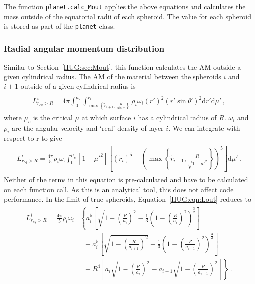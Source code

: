 \documentclass[11pt, oneside]{article}   	%
\begin{document}
The function \texttt{planet.calc\_Mout} applies the above equations and calculates the mass outside of the equatorial radii of each spheroid.
The value for each spheroid is stored as part of the \texttt{planet} class.


\subsubsection{Radial angular momentum distribution}

Similar to Section~\ref{HUG:sec:Mout}, this function calculates the AM outside a given cylindrical radius.
The AM of the material between the spheroids $i$ and $i+1$ outside of a given cylindrical radius is
%
\begin{align}
\begin{aligned}
L_{r_{eq}>R}^i = 4 \pi \int_0^{\mu_c} \int_{\max{\left \{ \tilde{r}_{i+1},\frac{R}{\sin\theta'}\right\}}}^{\tilde{r}_i} \rho_i \omega_i \left ( r' \right )^2 \left ( r' \sin \theta' \right )^2 \mathrm{d}r' \mathrm{d}\mu' \,,
\end{aligned}
\end{align}
%
where $\mu_c$ is the critical $\mu$ at which surface $i$ has a cylindrical radius of $R$.
$\omega_i$ and $\rho_i$ are the angular velocity and `real' density of layer $i$.
We can integrate with respect to r to give
%
\begin{align}
\begin{aligned}
L_{r_{eq}>R}^i = \frac{4 \pi}{5} \rho_i \omega_i \int_0^{\mu_c} \left [ 1-\mu'^2 \right ] \left [ \left(\tilde{r}_i\right)^5 - \left(\max{\left \{ \tilde{r}_{i+1},\frac{R}{\sqrt{1-\mu'^2}}\right\}} \right )^5 \right ] \mathrm{d}\mu' \,.
\label{HUG:eqn:Lout}
\end{aligned}
\end{align}
%
Neither of the terms in this equation is pre-calculated and have to be calculated on each function call. 
As this is an analytical tool, this does not affect code performance.
In the limit of true spheroids, Equation~\ref{HUG:eqn:Lout} reduces to
%
\begin{align}
\begin{aligned}
L_{r_{eq}>R}^i =  \frac{4 \pi}{5} \rho_i \omega_i  {} & \left \{ a_i^5 \left [ \sqrt{1-\left (\frac{R}{a_i}\right )^2} - \frac{1}{3} \left ( 1-\left (\frac{R}{a_i}\right )^2 \right )^{\frac{3}{2}} \right ] \right . \\
& \left . \;\; - a_i^5 \left [ \sqrt{1-\left (\frac{R}{a_{i+1}}\right )^2} - \frac{1}{3} \left ( 1-\left (\frac{R}{a_{i+1}}\right )^2 \right )^{\frac{3}{2}} \right ] \right . \\
& \left . \; \;- R^4 \left [ a_i \sqrt{1-\left (\frac{R}{a_{i}}\right )^2} - a_{i+1} \sqrt{1-\left (\frac{R}{a_{i+1}}\right )^2} \right ] \right \} \,.
\end{aligned}
\end{align}
%
\end{document}
